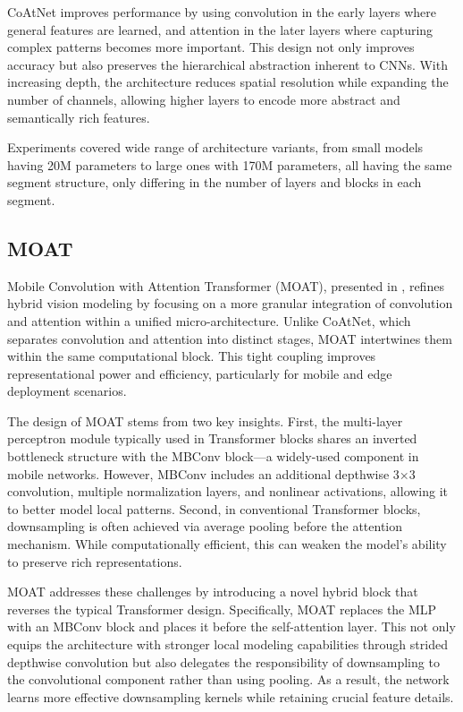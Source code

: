 \documentclass[a4paper,11pt,twoside]{report}
\theoremstyle{definition}
\begin{document}
CoAtNet improves performance by using convolution in the early layers where general features are learned, and attention in the later layers where capturing complex patterns becomes more important. This design not only improves accuracy but also preserves the hierarchical abstraction inherent to CNNs. With increasing depth, the architecture reduces spatial resolution while expanding the number of channels, allowing higher layers to encode more abstract and semantically rich features.

Experiments covered wide range of architecture variants, from small models having 20M parameters to large ones with 170M parameters, all having the same segment structure, only differing in the number of layers and blocks in each segment.

\subsection{MOAT}

Mobile Convolution with Attention Transformer (MOAT), presented in \cite{MOAT}, refines hybrid vision modeling by focusing on a more granular integration of convolution and attention within a unified micro-architecture. Unlike CoAtNet, which separates convolution and attention into distinct stages, MOAT intertwines them within the same computational block. This tight coupling improves representational power and efficiency, particularly for mobile and edge deployment scenarios.

The design of MOAT stems from two key insights. First, the multi-layer perceptron module typically used in Transformer blocks shares an inverted bottleneck structure with the MBConv block—a widely-used component in mobile networks. However, MBConv includes an additional depthwise 3×3 convolution, multiple normalization layers, and nonlinear activations, allowing it to better model local patterns. Second, in conventional Transformer blocks, downsampling is often achieved via average pooling before the attention mechanism. While computationally efficient, this can weaken the model’s ability to preserve rich representations.

MOAT addresses these challenges by introducing a novel hybrid block that reverses the typical Transformer design. Specifically, MOAT replaces the MLP with an MBConv block and places it before the self-attention layer. This not only equips the architecture with stronger local modeling capabilities through strided depthwise convolution but also delegates the responsibility of downsampling to the convolutional component rather than using pooling. As a result, the network learns more effective downsampling kernels while retaining crucial feature details.
\end{document}

